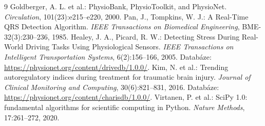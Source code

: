 \documentclass[11pt,a4paper]{article}
\begin{document}
\begin{thebibliography}{9}
 Goldberger, A. L. et al.: PhysioBank, PhysioToolkit, and PhysioNet.
  \emph{Circulation}, 101(23):e215--e220, 2000.
 Pan, J., Tompkins, W. J.: A Real-Time QRS Detection Algorithm.
  \emph{IEEE Transactions on Biomedical Engineering}, BME-32(3):230--236, 1985.
 Healey, J. A., Picard, R. W.: Detecting Stress During Real-World Driving Tasks
  Using Physiological Sensors. \emph{IEEE Transactions on Intelligent Transportation Systems},
  6(2):156--166, 2005. Databáze: \url{https://physionet.org/content/drivedb/1.0.0/}.
 Kim, N. et al.: Trending autoregulatory indices during treatment for traumatic
  brain injury. \emph{Journal of Clinical Monitoring and Computing}, 30(6):821--831, 2016.
  Databáze: \url{https://physionet.org/content/charisdb/1.0.0/}.
 Virtanen, P. et al.: SciPy 1.0: fundamental algorithms for scientific computing
  in Python. \emph{Nature Methods}, 17:261--272, 2020.
\end{thebibliography}
\end{document}
